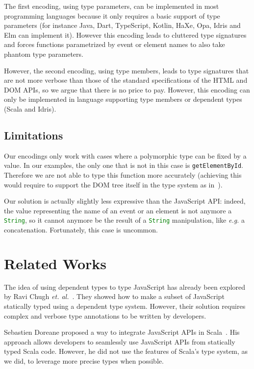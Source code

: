 \documentclass{llncs}
\newcommand{\jscode}[1]{\lstinline[language=JavaScript]|#1|}
\begin{document}
The first encoding, using type parameters, can be implemented in most programming languages because it only requires a basic support of type parameters (for instance Java, Dart, TypeScript, Kotlin, HaXe, Opa, Idris and Elm can implement it). However this encoding leads to cluttered type signatures and forces functions parametrized by event or element names to also take phantom type parameters.

However, the second encoding, using type members, leads to type signatures that are not more verbose than those of the standard specifications of the HTML and DOM APIs, so we argue that there is no price to pay. However, this encoding can only be implemented in language supporting type members or dependent types (Scala and Idris).

\subsection{Limitations}

Our encodings only work with cases where a polymorphic type can be fixed by a value. In our examples, the only one that is not in this case is \jscode{getElementById}. Therefore we are not able to type this function more accurately (achieving this would require to support the DOM tree itself in the type system as in~\cite{Lerner13_TypedJQuery}).

Our solution is actually slightly less expressive than the JavaScript API: indeed, the value representing the name of an event or an element is not anymore a \jscode{String}, so it cannot anymore be the result of a \jscode{String} manipulation, like \emph{e.g.} a concatenation. Fortunately, this case is uncommon.

\section{Related Works}
\label{sec-related}

The idea of using dependent types to type JavaScript has already been explored by Ravi Chugh \emph{et. al.}~\cite{Chugh12_DJS}. They showed how to make a subset of JavaScript statically typed using a dependent type system. However, their solution requires complex and verbose type annotations to be written by developers.

Sebastien Doreane proposed a way to integrate JavaScript APIs in Scala~\cite{Doeraene13_ScalaJs}. His approach allows developers to seamlessly use JavaScript APIs from statically typed Scala code. However, he did not use the features of Scala's type system, as we did, to leverage more precise types when possible.
\end{document}
